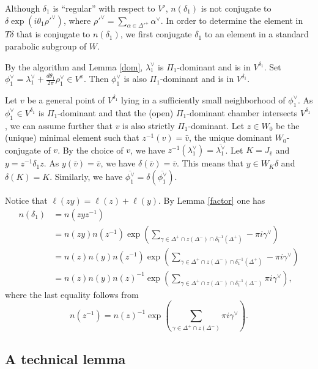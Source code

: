 \documentclass[12pt,leqno]{article}
\renewcommand{\a}{\mathfrak a}
\newcommand{\g}{\mathfrak g}
\def\a{\alpha}
\def\g{\gamma}
\def\d{\delta}
\def\D{\Delta}
\def\th{\theta}
\def\l{\lambda}
\def\i{^{-1}}
\begin{document}
Although $\d_1$ is ``regular'' with respect to $V'$, $n(\d_1)$ is not conjugate to $\d \exp(i \th_1 {\rho'}^\vee)$, where ${\rho'}^\vee=\sum_{\a \in {\D'}^+} \a^\vee$. In order to determine the element in $T \d$ that is conjugate to $n(\d_1)$, we first conjugate $\d_1$ to an element in a standard parabolic subgroup of $W$.

By the algorithm and Lemma \ref{dom}, $\l_1^\vee$ is $\Pi_1$-dominant and is in $V^{\d_1}$. Set $\phi_1^\vee = \l_1^\vee + \frac{d \th_1}{2 \pi}\rho_1^\vee \in V^x$. Then $\phi_1^\vee$ is also $\Pi_1$-dominant and is in $V^{\d_1}$.

Let $v$ be a general point of $V^{\d_1}$ lying in a sufficiently small neighborhood of $\phi_1^\vee$. As $\phi_1^\vee \in V^{\d_1}$ is $\Pi_1$-dominant and that the (open) $\Pi_1$-dominant chamber intersects $V^{\d_1}$, we can assume further that $v$ is also strictly $\Pi_1$-dominant. Let $z \in W_0$ be the (unique) minimal element such that $z\i(v) = \bar v$, the unique dominant $W_0$-conjugate of $v$. By the choice of $v$, we have $z^{-1}(\l_1^\vee)=\overline{\l_1^\vee}$. Let $K=J_{\bar v}$ and $y = z^{-1} \d_1 z$. As $y(\bar v)=\bar v$, we have $\d(\bar v)=\bar v$. This means that $y \in W_K \d$ and $\d(K)=K$. Similarly, we have $\overline{\phi_1^\vee} = \d(\overline{\phi_1^\vee})$.

Notice that $\ell(z y)=\ell(z) + \ell(y)$. By Lemma \ref{factor} one has \begin{align*} n(\d_1) &= n(z y z^{-1}) \\ &= n(z y) n(z^{-1}) \exp(\sum_{\g \in \D^+ \cap z(\D^-) \cap \d_1 \i (\D^+)} -\pi i \g^\vee) \\ &= n(z) n(y) n(z^{-1}) \exp(\sum_{\g \in \D^+ \cap z(\D^-) \cap \d_1 \i (\D^+)} -\pi i \g^\vee) \\ &= n(z) n(y) n(z)^{-1} \exp(\sum_{\g \in \D^+ \cap z(\D^-) \cap \d_1 \i(\D^-)} \pi i \g^\vee), \end{align*} where the last equality follows from $$n(z^{-1})=n(z)^{-1} \exp(\sum_{\g \in \D^+ \cap z(\D^-)} \pi i \g^\vee).$$

\subsection{A technical lemma}
\end{document}
